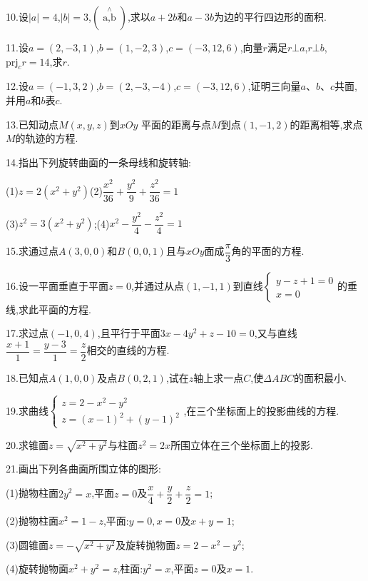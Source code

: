 \documentclass[oneside]{book}
\begin{document}
10.设$|a| = 4$,$\left| b \right| = 3$,$(\mathop {a,b}\limits^ \wedge  )$,求以$a+2b$和$a-3b$为边的平行四边形的面积.

11.设$a = (2, - 3,1)$,$b = (1, - 2,3)$,$c = ( - 3,12,6)$,向量$r$满足$r \bot a$,$r \bot b$,${\text{pr}}{{\text{j}}_c}r = 14$,求$r$.

12.设$a = ( - 1,3,2)$,$b = (2, - 3, - 4)$,$c = ( - 3,12,6)$,证明三向量$a$、$b$、$c$共面,并用$a$和$b$表$c$.

13.已知动点$M(x,y,z)$到$xOy$
平面的距离与点$M$到点$(1,-1,2)$的距离相等,求点$M$的轨迹的方程.

14.指出下列旋转曲面的一条母线和旋转轴:

(1)$z = 2\left( {{x^2} + {y^2}} \right)$\quad (2)$\dfrac{{{x^2}}}{{36}} + \dfrac{{{y^2}}}{9} + \dfrac{{{z^2}}}{{36}} = 1$

(3)${z^2}{{ }} = 3\left( {{x^2} + {y^2}} \right)$;(4)${x^2} - \dfrac{{{y^2}}}{4} - \dfrac{{{z^2}}}{4} = 1$

15.求通过点$A\left( {3,0,0} \right)$和$B\left( {0,0,1} \right)$且与$xOy$面成$\dfrac{\pi }{3}$角的平面的方程.

16.设一平面垂直于平面$z = 0$,并通过从点$(1,-1,1)$到直线$\left\{\begin{array}{l}{y-z+1=0} \\ {x=0}\end{array}\right.$的垂线,求此平面的方程.

17.求过点$(-1,0,4)$,且平行于平面$3x - 4{y^2} + z - 10 = 0$,又与直线$\dfrac{{x + 1}}{1} = \dfrac{{y - 3}}{1} = \dfrac{z}{2}$相交的直线的方程.

18.已知点$A\left( {1,0,0} \right)$及点$B\left( {0,2,1} \right)$,试在$z$轴上求一点$C$,使$\Delta ABC$的面积最小.

19.求曲线$\left\{\begin{array}{l}{z=2-x^{2}-y^{2}} \\ {z=(x-1)^{2}+(y-1)^{2}}\end{array}\right.$,在三个坐标面上的投影曲线的方程.

20.求锥面$z = \sqrt {{x^2} + {y^2}} $与柱面${z^2} = 2x$所围立体在三个坐标面上的投影.

21.画出下列各曲面所围立体的图形:

(1)抛物柱面$2{y^2} = x$,平面$z = 0$及$\dfrac{x}{4} + \dfrac{y}{2} + \dfrac{z}{2} = 1$;

(2)抛物柱面${x^2} = 1 - z$,平面:$y = 0,x = 0$及$x + y = 1$;

(3)圆锥面$z =  - \sqrt {{x^2} + {y^2}} $及旋转抛物面$z = 2 - {x^2} - {y^2}$;

(4)旋转抛物面${x^2} + {y^2} = z$,柱面:${y^2} = x$,平面$z = 0$及$x=1$.

 
\end{document}
